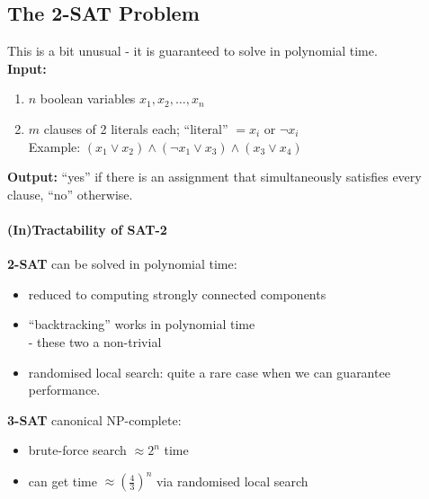 \documentclass{scrartcl}
\begin{document}
\subsection{The 2-SAT Problem}
\label{sec:19-5}
This is a bit unusual - it is guaranteed to solve in polynomial time.\\
{\bf Input:} 
\begin{enumerate}
\item $n$ boolean variables $x_1, x_2, \dots, x_n$ 
\item $m$ clauses of 2 literals each; ``literal'' $= x_i$ or $\neg x_i$ \\
Example: $(x_1 \vee x_2) \wedge (\neg x_1 \vee x_3) \wedge (x_3 \vee x_4) $ 
\end{enumerate}
{\bf Output:} ``yes'' if there is an assignment that simultaneously satisfies every clause, ``no'' otherwise.

\paragraph{(In)Tractability of SAT-2}
{\bf 2-SAT} can be solved in polynomial time:
\begin{itemize}
\item reduced to computing strongly connected components
\item ``backtracking'' works in polynomial time\\
- these two a non-trivial
\item randomised local search: quite a rare case when we can guarantee performance.
\end{itemize}
{\bf 3-SAT} canonical NP-complete:
\begin{itemize}
\item brute-force search $\approx 2^n$ time
\item can get time $\approx (\frac43)^n$ via randomised local search
\end{itemize}
\end{document}

